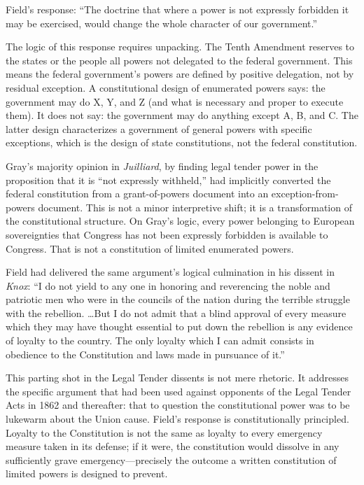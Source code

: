 \documentclass[12pt]{article}
\begin{document}
Field's response: ``The doctrine that where a power is not expressly
forbidden it may be exercised, would change the whole character of
our government.''

The logic of this response requires unpacking. The Tenth Amendment
reserves to the states or the people all powers not delegated to the
federal government. This means the federal government's powers are
defined by positive delegation, not by residual exception. A
constitutional design of enumerated powers says: the government may
do X, Y, and Z (and what is necessary and proper to execute them).
It does not say: the government may do anything except A, B, and C.
The latter design characterizes a government of general powers with
specific exceptions, which is the design of state constitutions, not
the federal constitution.

Gray's majority opinion in \textit{Juilliard}, by finding legal tender
power in the proposition that it is ``not expressly withheld,'' had
implicitly converted the federal constitution from a grant-of-powers
document into an exception-from-powers document. This is not a minor
interpretive shift; it is a transformation of the constitutional
structure. On Gray's logic, every power belonging to European sovereignties
that Congress has not been expressly forbidden is available to Congress.
That is not a constitution of limited enumerated powers.

Field had delivered the same argument's logical culmination in his
dissent in \textit{Knox}: ``I do not yield to any one in honoring and
reverencing the noble and patriotic men who were in the councils of the
nation during the terrible struggle with the rebellion. \ldots But I do
not admit that a blind approval of every measure which they may have
thought essential to put down the rebellion is any evidence of loyalty
to the country. The only loyalty which I can admit consists in obedience
to the Constitution and laws made in pursuance of it.''

This parting shot in the Legal Tender dissents is not mere rhetoric. It
addresses the specific argument that had been used against opponents of
the Legal Tender Acts in 1862 and thereafter: that to question the
constitutional power was to be lukewarm about the Union cause. Field's
response is constitutionally principled. Loyalty to the Constitution is
not the same as loyalty to every emergency measure taken in its defense;
if it were, the constitution would dissolve in any sufficiently grave
emergency---precisely the outcome a written constitution of limited
powers is designed to prevent.
\end{document}
